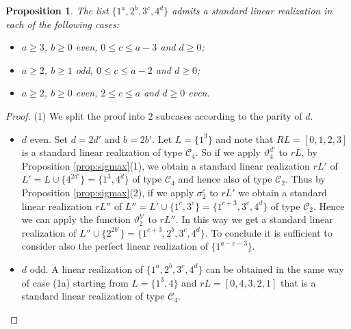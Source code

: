 \documentclass{amsart}
\newtheorem{prop}{Proposition}[section]
\theoremstyle{definition}
\numberwithin{equation}{section}
\def\C{\mathcal{C}}
\def\th{\vartheta}
\begin{document}
\begin{prop}\label{M}
The list $\{1^a,2^b,3^c,4^d\}$ admits a standard linear realization in each of the following cases:
\begin{itemize}
  \item [(1)] $a\geq3$, $b\geq0$ even, $0\leq c \leq a-3$ and $d\geq 0$;
  \item [(2)] $a\geq2$, $b\geq1$ odd, $0\leq c \leq a-2$ and $d\geq 0$;
  \item [(3)] $a\geq2$, $b\geq0$ even, $2\leq c \leq a$ and $d\geq 0$ even.
\end{itemize}

\end{prop}
\begin{proof}
(1) We split the proof into $2$ subcases according to the parity of $d$.
\begin{itemize}
\item [(1a)] $d$ even.  Set $d=2d'$ and $b=2b'$.
Let $L=\{1^3\}$ and
note that $RL=[0,1,2,3]$ is a standard linear realization of type $\C_4$.
So if we apply $\th_4^{d'}$ to $rL$, by Proposition \ref{prop:sigmax}(1),  we obtain a standard
linear realization $rL'$ of $L'=L\cup \{4^{2d'}\}=\{1^3,4^d\}$ of type $\C_4$
and hence also of type $\C_2$. Thus by Proposition \ref{prop:sigmax}(2), if we apply $\sigma_2^c$ to $rL'$ we obtain a
standard linear realization $rL''$ of $L''=L'\cup\{1^{c},3^{c}\}=\{1^{c+3},3^c,4^d\}$
of type $\C_2$. Hence we can apply the function $\th_2^{b'}$ to $rL''$. In this way we get a
standard linear realization of $L''\cup \{2^{2b'}\}=\{1^{c+3},2^b,3^c,4^d\}$.
To conclude it is sufficient to consider also the perfect linear realization of $\{1^{a-c-3}\}$.
\item [(1b)] $d$ odd.
 A linear realization of $\{1^a,2^b,3^c,4^d\}$ can be obtained in the same way of case (1a) starting from
$L=\{1^3,4\}$ and
 $rL=[0,4,3,2,1]$ that is a standard linear realization of type $\C_4$.
\end{itemize}


\end{proof}
\end{document}
